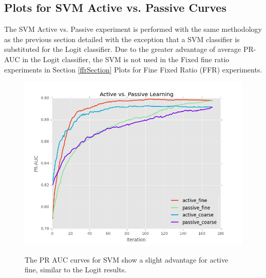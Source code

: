 \documentclass[ms]{nuthesis}
\begin{document}
\clearpage

\subsection{Plots for SVM Active vs. Passive Curves}
\par The SVM Active vs. Passive experiment is performed with the same methodology
as the previous section detailed with the exception that a SVM classifier is
substituted for the Logit classifier. Due to the greater advantage of average
PR-AUC in the Logit classifier, the SVM is not used in the Fixed fine ratio
experiments in Section \ref{ffrSection} Plots for Fine Fixed Ratio (FFR) experiments.

\FloatBarrier
\begin{figure}[!htb]
	\centering
    \includegraphics[width=1.0\columnwidth]{fig/runActPassSVM_pr}
    \label{fig:ActiveVsPassivePRSVM}
    \caption{The PR AUC curves for SVM show a slight advantage for active fine,
     similar to the Logit results.}
\end{figure}
\FloatBarrier
\end{document}
